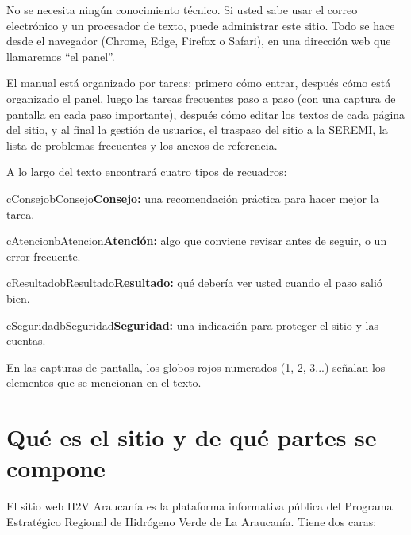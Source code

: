 \documentclass[11pt,letterpaper]{report}
\begin{document}
No se necesita ningún conocimiento técnico. Si usted sabe usar el correo electrónico y un procesador de texto, puede administrar este sitio. Todo se hace desde el navegador (Chrome, Edge, Firefox o Safari), en una dirección web que llamaremos “el panel”.

El manual está organizado por tareas: primero cómo entrar, después cómo está organizado el panel, luego las tareas frecuentes paso a paso (con una captura de pantalla en cada paso importante), después cómo editar los textos de cada página del sitio, y al final la gestión de usuarios, el traspaso del sitio a la SEREMI, la lista de problemas frecuentes y los anexos de referencia.

A lo largo del texto encontrará cuatro tipos de recuadros:

\begin{recuadro}{cConsejo}{bConsejo}\textbf{\color{bConsejo}Consejo:} una recomendación práctica para hacer mejor la tarea.\end{recuadro}
\begin{recuadro}{cAtencion}{bAtencion}\textbf{\color{bAtencion}Atención:} algo que conviene revisar antes de seguir, o un error frecuente.\end{recuadro}
\begin{recuadro}{cResultado}{bResultado}\textbf{\color{bResultado}Resultado:} qué debería ver usted cuando el paso salió bien.\end{recuadro}
\begin{recuadro}{cSeguridad}{bSeguridad}\textbf{\color{bSeguridad}Seguridad:} una indicación para proteger el sitio y las cuentas.\end{recuadro}
En las capturas de pantalla, los globos rojos numerados (1, 2, 3...) señalan los elementos que se mencionan en el texto.

\section{Qué es el sitio y de qué partes se compone}
El sitio web H2V Araucanía es la plataforma informativa pública del Programa Estratégico Regional de Hidrógeno Verde de La Araucanía. Tiene dos caras:
\end{document}
